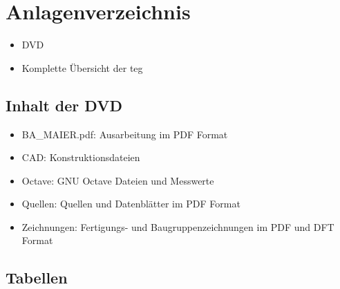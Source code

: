 \chapter{Anlagenverzeichnis}
\begin{itemize}
\item DVD
 \item Komplette Übersicht der \gls{teg}
\end{itemize}

\section{Inhalt der DVD}

\begin{itemize}
 \item BA\_MAIER.pdf: Ausarbeitung im PDF Format
 \item CAD:	Konstruktionsdateien
 \item Octave:	GNU Octave Dateien und Messwerte
 \item Quellen:	Quellen und Datenblätter im PDF Format
 \item Zeichnungen: Fertigungs- und Baugruppenzeichnungen im PDF und DFT Format
\end{itemize}

%
%
% 
\newpage
\section{Tabellen}
%
